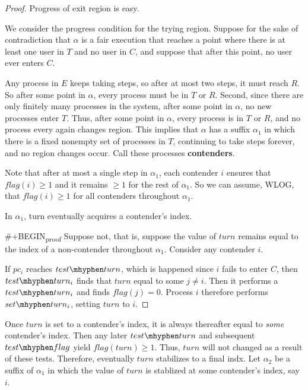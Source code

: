 \documentclass[11pt]{article}
\def \testturn {test\mhyphen turn}
\def \testflag {test\mhyphen flag}
\def \setturn {set\mhyphen turn}
\begin{document}
\begin{proof}
Progress of exit region is easy.

We consider the progress condition for the trying region. Suppose for the sake of contradiction that \(\alpha\)
is a fair execution that reaches a point where there is at least one user in \(T\) and no user in \(C\), and
suppose that after this point, no user ever enters \(C\).

Any process in \(E\) keeps taking steps, so after at most two steps, it must reach \(R\). So after
some point in \(\alpha\), every process must be in \(T\) or \(R\). Second, since there are only
finitely many processes in the system, after some point in \(\alpha\), no new processes enter \(T\).
Thus, after some point in \(\alpha\), every process is in \(T\) or \(R\), and no process every again
changes region. This implies that \(\alpha\) has a suffix \(\alpha_1\) in which there is a fixed
nonempty set of processes in \(T\), continuing to take steps forever, and no region changes occur.
Call these processes \textbf{contenders}.

Note that after at most a single step in \(\alpha_1\), each contender \(i\) ensures that
\(flag(i)\ge1\)  and it remains \(\ge 1\) for the rest of \(\alpha_1\). So we can assume, WLOG, that
\(flag(i)\ge 1\) for all contenders throughout \(\alpha_1\).

\begin{claim}
In \(\alpha_1\), turn eventually acquires a contender's index.
\end{claim}

\#+BEGIN\textsubscript{proof}
Suppose not, that is, suppose the value of \(turn\) remains equal to the index of a non-contender
throughout \(\alpha_1\). Consider any contender \(i\).

If \(pc_i\) reaches \(\testturn\), which is happened since \(i\) fails to enter \(C\), then
\(\testturn_i\) finds that \(turn\) equal to some \(j\neq i\).
Then it performs a \(\testturn_i\) and finds \(flag(j)=0\). Process \(i\) therefore performs
\(\setturn_i\), setting \(turn\) to \(i\).
\end{proof}
Once \(turn\) is set to a contender's index, it is always thereafter equal to \emph{some} contender's index.
Then any later \(\testturn\) and subsequent \(\testflag\) yield \(flag(turn)\ge 1\). Thus, \(turn\)
will not changed as a result of these tests. Therefore, eventually \(turn\) stabilizes to a final
indx. Let \(\alpha_2\) be a suffix of \(\alpha_1\) in which the value of \(turn\) is stablized at some
contender's index, say \(i\).
\end{document}
